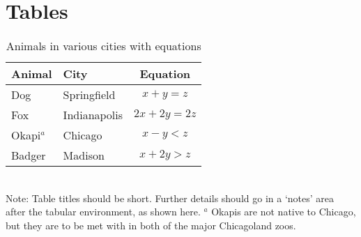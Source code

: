 \documentclass[11pt]{article}
\begin{document}





\newpage{}

\section*{Tables}
\renewcommand{\thetable}{\arabic{table}}
\setcounter{table}{0}

\begin{table}[h]
\caption{Animals in various cities with equations}
\label{Table:Okapi}
\centering
\begin{tabular}{llc}\hline
Animal    & City         & Equation \\ \hline
Dog       & Springfield  & $x+y=z$ \\
Fox       & Indianapolis & $2x+2y=2z$ \\
Okapi$^a$ & Chicago      & $x-y<z$ \\
Badger    & Madison      & $x+2y>z$ \\ \hline
\end{tabular}
\bigskip{}
\\
{\footnotesize Note: Table titles should be short. Further details 
should go in a `notes' area after the tabular environment, as shown 
here. $^a$ Okapis are not native to Chicago, but they are to be met with 
in both of the major Chicagoland zoos.}
\end{table}
\end{document}
